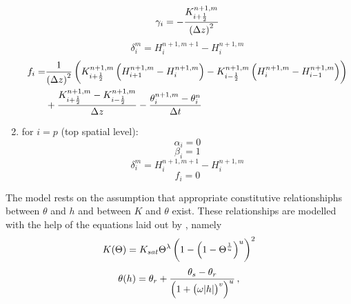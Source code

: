 \begin{enumerate}
  \begin{equation}
    \label{eq:gamma_intermediate}
    \gamma_i = - \frac{K_{i+\frac{1}{2}}^{n+1,m}}{\del{ \Delta z }^2}
  \end{equation}
  \begin{equation}
    \label{eq:delta_intermediate}
    \delta_i^m = H_i^{n+1,m+1} - H_i^{n+1,m}
  \end{equation}
  \begin{equation}
    \label{eq:f_intermediate}
    \begin{split}
      f_i = &\frac{1}{\del{ \Delta z }^2} \del{ K_{i+\frac{1}{2}}^{n+1,m} \del{ H_{i+1}^{n+1,m} - H_{i}^{n+1,m} } - K_{i-\frac{1}{2}}^{n+1,m} \del{ H_{i}^{n+1,m} - H_{i-1}^{n+1,m} } } \\
      &+ \frac{K_{i+\frac{1}{2}}^{n+1,m} - K_{i-\frac{1}{2}}^{n+1,m}}{\Delta z} - \frac{\theta_i^{n+1,m} - \theta_i^{n}}{\Delta t}
    \end{split}
  \end{equation}
\item for $i = p$ (top spatial level):
  \begin{equation}
    \label{eq:alpha_top}
    \alpha_i = 0
  \end{equation}
  \begin{equation}
    \label{eq:beta_top}
    \beta_i = 1
  \end{equation}
  \begin{equation}
    \label{eq:delta_top}
    \delta_i^m = H_i^{n+1,m+1} - H_i^{n+1,m}
  \end{equation}
  \begin{equation}
    \label{eq:f_top}
    f_i = 0
  \end{equation}
\end{enumerate}
The model rests on the assumption that appropriate constitutive relationshiphs between $\theta$ and $h$ and between $K$ and $\theta$ exist.  These relationships are modelled with the help of the equations laid out by \textcite{genuchten_closed-form_1980}, namely
\begin{equation}
  \label{eq:vange_K}
  K(\Theta) = K_{sat} \Theta^{\lambda} \del{ 1 - \del{ 1 - \Theta^{\frac{1}{u}} }^u }^2
\end{equation}
\begin{equation}
  \label{eq:vange_theta}
  \theta(h) = \theta_r + \frac{\theta_s - \theta_r}{\del{ 1 + \del{ \omega \abs{h} }^v }^u} \, ,
\end{equation}
